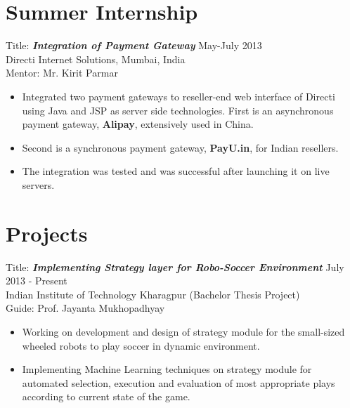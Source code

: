 \documentclass[hidelinks,margin,line,10pt,a4paper]{resume}
\begin{document}
\begin{resume}
    \section{\mysidestyle Summer Internship}


Title: \textbf{\emph{Integration of Payment Gateway }} \hfill May-July 2013 \\
Directi Internet Solutions, Mumbai, India \\
Mentor: Mr. Kirit Parmar
\vspace{2mm}%
\begin{itemize}
\item Integrated two payment gateways to reseller-end web interface of Directi using Java and JSP as server side technologies. First is an asynchronous payment gateway, \textbf{Alipay}, extensively used in China.
\item Second is a synchronous payment gateway, \textbf{PayU.in}, for Indian resellers.
\item The integration was tested and was successful after launching it on live servers.
\end{itemize}

    \section{\mysidestyle Projects}
    
Title: \textbf{\emph {Implementing Strategy layer for Robo-Soccer Environment }} \hfill July 2013 - Present \\ Indian Institute of Technology Kharagpur \hfill (Bachelor Thesis Project) \\
Guide: Prof. Jayanta Mukhopadhyay 
\vspace{2mm}%
\begin{itemize}
\item Working on development and design of strategy module for the small-sized wheeled robots to play soccer in dynamic environment.
\item Implementing Machine Learning techniques on strategy module for automated selection, execution and evaluation of most appropriate plays according to current state of the game.
\end{itemize}


\end{resume}
\end{document}
